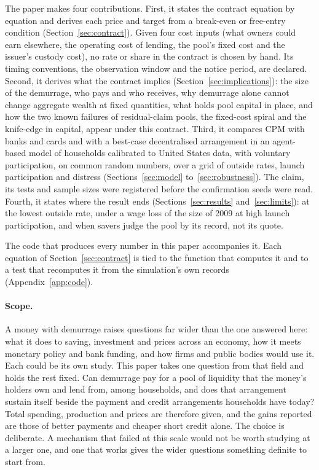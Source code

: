 \documentclass[10pt,a4paper]{article}
\theoremstyle{remark}
\begin{document}
The paper makes four contributions.
First, it states the contract equation by equation and derives each price and
target from a break-even or free-entry condition
(Section~\ref{sec:contract}). Given four cost inputs (what owners could earn
elsewhere, the operating cost of lending, the pool's fixed cost and the
issuer's custody cost), no rate or share in the contract is chosen by
hand. Its timing conventions, the observation window and the notice period,
are declared.
Second, it derives what the contract implies (Section~\ref{sec:implications}):
the size of the demurrage, who pays and who receives, why demurrage alone cannot
change aggregate wealth at fixed quantities, what holds pool capital in place,
and how the two known failures of residual-claim pools, the fixed-cost spiral
and the knife-edge in capital, appear under this contract.
Third, it compares CPM with banks and cards and with a best-case decentralised
arrangement in an agent-based model of \NumPeople{} households calibrated to
United States data, with voluntary participation, on common random numbers,
over a grid of outside rates, launch participation and distress
(Sections~\ref{sec:model} to~\ref{sec:robustness}). The claim, its tests and
sample sizes were registered before the confirmation seeds were read.
Fourth, it states where the result ends (Sections~\ref{sec:results}
and~\ref{sec:limits}): at the lowest outside rate, under a wage loss of the
size of 2009 at high launch participation, and when savers judge the pool
by its record, not its quote.

The code that produces every number in this paper accompanies it. Each equation of
Section~\ref{sec:contract} is tied to the function that computes it and to a
test that recomputes it from the simulation's own records
(Appendix~\ref{app:code}).

\paragraph{Scope.}
A money with demurrage raises questions far wider than the one
answered here: what it does to saving, investment and prices across an
economy, how it meets monetary policy and bank funding, and how firms
and public bodies would use it. Each could be its own study. This paper
takes one question from that field and holds the rest fixed. Can demurrage
pay for a pool of liquidity that the money's holders own and lend from,
among households, and does that arrangement sustain itself beside the payment
and credit arrangements households have today? Total spending, production and
prices are therefore given, and the gains reported are those of better
payments and cheaper short credit alone. The choice is deliberate. A mechanism
that failed at this scale would not be worth studying at a larger one,
and one that works gives the wider questions something definite to start from.
\end{document}
